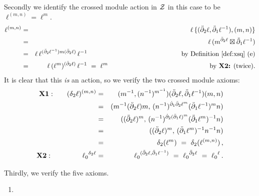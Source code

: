 \begin{pf}
\noindent
Secondly we identify the crossed module action in $\mathcal{Z}$ in this case
to be $\ell^{(m,n)} = \ell^m$. 
\begin{eqnarray*}
\ell^{(m,n)}
  & = &  \ell\,\{(\ddbdyt\ell,\ddbdyo\ell^{-1}),(m,n)\} \\
  & = &  \ell\,(m^{\ddbdyt\ell} \bt \ddbdyo\ell^{-1}) \\
  & = &  \ell\,\ell^{(\ddbdyt\ell^{-1})m(\ddbdyt\ell)}\,\ell^{-1} 
         \hspace{50mm} \mbox{by Definition \ref{def:xsq} (e)} \\
  & = &  \ell\,(\ell^m)^{(\ddbdyt\ell)}\,\ell^{-1}
   ~=~   \ell^m
         \hspace{54mm} \mbox{by {\bf X2:} (twice).} 
\end{eqnarray*}
It is clear that this \emph{is} an action,
so we verify the two crossed module axioms:
\begin{eqnarray*}
{\bf X1:} \qquad
(\delta_2\ell)^{(m,n)}
  & = &  (m^{-1},(n^{-1})^{m^{-1}})(\ddbdyt\ell,\ddbdyo\ell^{-1})(m,n) \\
  & = &  (m^{-1}(\ddbdyt\ell)m,\, 
          (n^{-1})^{\dbdyo\ddbdyt\ell^m} (\ddbdyo\ell^{-1})^m n) \\
  & = &  ((\ddbdyt\ell)^m,\, 
          (n^{-1})^{\dbdyt(\ddbdyo\ell)^m} (\ddbdyo\ell^m)^{-1} n) \\
  & = &  ((\ddbdyt\ell)^m,\, 
          (\ddbdyo\ell^m)^{-1} n^{-1} n) \\
  & = &  \delta_2(\ell^m) ~=~ \delta_2(\ell^{(m,n)})\,, \\
{\bf X2:} \hspace{16mm}
{\ell_0}^{\delta_2\ell}
  & = &  {\ell_0}^{(\ddbdyt\ell,\ddbdyo\ell^{-1})}
   ~=~   {\ell_0}^{\ddbdyt\ell}
   ~=~   {\ell_0}^{\ell}\,. \\
\end{eqnarray*}

\noindent
Thirdly, we verify the five axioms.
\begin{enumerate}[{\bf 2X1:}]
\item~


\end{enumerate}
\end{pf}
